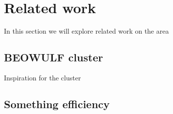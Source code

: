 \clearpage
\section{Related work}
In this section we will explore related work on the area
\subsection{BEOWULF cluster}
Inspiration for the cluster\cite{RPI_BEOWULF}
\subsection{Something efficiency}
